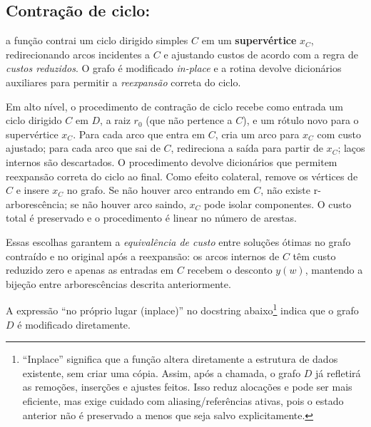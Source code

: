 \subsection{Contração de ciclo:}
a função contrai um ciclo dirigido simples \(C\) em um \textbf{supervértice} \(x_C\), redirecionando arcos incidentes a \(C\) e ajustando custos de acordo com a regra de \emph{custos reduzidos}. O grafo é modificado \emph{in-place} e a rotina devolve dicionários auxiliares para permitir a \emph{reexpansão} correta do ciclo.

Em alto nível, o procedimento de contração de ciclo recebe como entrada um ciclo dirigido $C$ em $D$, a raiz $r_0$ (que não pertence a $C$), e um rótulo novo para o supervértice $x_C$. Para cada arco que entra em $C$, cria um arco para $x_C$ com custo ajustado; para cada arco que sai de $C$, redireciona a saída para partir de $x_C$; laços internos são descartados. O procedimento devolve dicionários que permitem reexpansão correta do ciclo ao final. Como efeito colateral, remove os vértices de $C$ e insere $x_C$ no grafo. Se não houver arco entrando em $C$, não existe r-arborescência; se não houver arco saindo, $x_C$ pode isolar componentes. O custo total é preservado e o procedimento é linear no número de arestas.

Essas escolhas garantem a \emph{equivalência de custo} entre soluções ótimas no grafo contraído e no original após a reexpansão: os arcos internos de \(C\) têm custo reduzido zero e apenas as entradas em \(C\) recebem o desconto \(y(w)\), mantendo a bijeção entre arborescências descrita anteriormente.


\noindent A expressão “no próprio lugar (in\-place)” no docstring abaixo\footnote{“In\-place” significa que a função altera diretamente a estrutura de dados existente, sem criar uma cópia. Assim, após a chamada, o grafo \(D\) já refletirá as remoções, inserções e ajustes feitos. Isso reduz alocações e pode ser mais eficiente, mas exige cuidado com aliasing/referências ativas, pois o estado anterior não é preservado a menos que seja salvo explicitamente.} indica que o grafo \(D\) é modificado diretamente.

